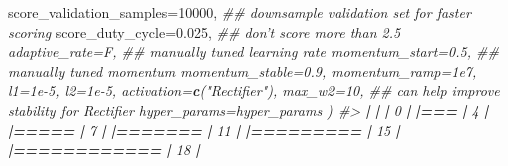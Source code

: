 \documentclass[]{book}
\newenvironment{Shaded}{\begin{snugshade}}{\end{snugshade}}
\newcommand{\CommentTok}[1]{\textcolor[rgb]{0.56,0.35,0.01}{\textit{#1}}}
\newcommand{\DataTypeTok}[1]{\textcolor[rgb]{0.13,0.29,0.53}{#1}}
\newcommand{\DecValTok}[1]{\textcolor[rgb]{0.00,0.00,0.81}{#1}}
\newcommand{\ErrorTok}[1]{\textcolor[rgb]{0.64,0.00,0.00}{\textbf{#1}}}
\newcommand{\FloatTok}[1]{\textcolor[rgb]{0.00,0.00,0.81}{#1}}
\newcommand{\KeywordTok}[1]{\textcolor[rgb]{0.13,0.29,0.53}{\textbf{#1}}}
\newcommand{\NormalTok}[1]{#1}
\newcommand{\OperatorTok}[1]{\textcolor[rgb]{0.81,0.36,0.00}{\textbf{#1}}}
\newcommand{\StringTok}[1]{\textcolor[rgb]{0.31,0.60,0.02}{#1}}
\begin{document}
\begin{Shaded}
\begin{Highlighting}[]
{  \DataTypeTok{score_validation_samples=}\DecValTok{10000}\NormalTok{, }\CommentTok{## downsample validation set for faster scoring}
  \DataTypeTok{score_duty_cycle=}\FloatTok{0.025}\NormalTok{,         }\CommentTok{## don't score more than 2.5% of the wall time}
  \DataTypeTok{adaptive_rate=}\NormalTok{F,                }\CommentTok{## manually tuned learning rate}
  \DataTypeTok{momentum_start=}\FloatTok{0.5}\NormalTok{,             }\CommentTok{## manually tuned momentum}
  \DataTypeTok{momentum_stable=}\FloatTok{0.9}\NormalTok{, }
  \DataTypeTok{momentum_ramp=}\FloatTok{1e7}\NormalTok{, }
  \DataTypeTok{l1=}\FloatTok{1e-5}\NormalTok{,}
  \DataTypeTok{l2=}\FloatTok{1e-5}\NormalTok{,}
  \DataTypeTok{activation=}\KeywordTok{c}\NormalTok{(}\StringTok{"Rectifier"}\NormalTok{),}
  \DataTypeTok{max_w2=}\DecValTok{10}\NormalTok{,                      }\CommentTok{## can help improve stability for Rectifier}
  \DataTypeTok{hyper_params=}\NormalTok{hyper_params}
\NormalTok{)}
\CommentTok{#> }
  \OperatorTok{|}\StringTok{                                                                       }
\StringTok{  }\ErrorTok{|}\StringTok{                                                                 }\ErrorTok{|}\StringTok{   }\DecValTok{0}\NormalTok{%}
  \OperatorTok{|}\StringTok{                                                                       }
\StringTok{  }\ErrorTok{|===}\StringTok{                                                              }\ErrorTok{|}\StringTok{   }\DecValTok{4}\NormalTok{%}
  \OperatorTok{|}\StringTok{                                                                       }
\StringTok{  }\ErrorTok{|=====}\StringTok{                                                            }\ErrorTok{|}\StringTok{   }\DecValTok{7}\NormalTok{%}
  \OperatorTok{|}\StringTok{                                                                       }
\StringTok{  }\ErrorTok{|=======}\StringTok{                                                          }\ErrorTok{|}\StringTok{  }\DecValTok{11}\NormalTok{%}
  \OperatorTok{|}\StringTok{                                                                       }
\StringTok{  }\ErrorTok{|=========}\StringTok{                                                        }\ErrorTok{|}\StringTok{  }\DecValTok{15}\NormalTok{%}
  \OperatorTok{|}\StringTok{                                                                       }
\StringTok{  }\ErrorTok{|============}\StringTok{                                                     }\ErrorTok{|}\StringTok{  }\DecValTok{18}\NormalTok{%}
  \OperatorTok{|}\StringTok{                                                                       }
}}}}}}}}
\end{Highlighting}
\end{Shaded}
\end{document}
